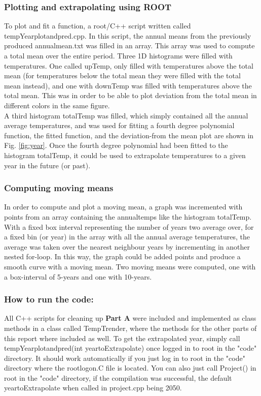 \documentclass[a4paper]{article}
\begin{document}
\subsubsection{Plotting and extrapolating using ROOT}
To plot and fit a function, a root/C++ script written called tempYearplotandpred.cpp. In this script, the annual means from the previously produced annualmean.txt was filled in an array. This array was used to compute a total mean over the entire period. Three 1D histograms were filled with
temperatures. One called upTemp, only filled with temperatures above the total mean (for temperatures below the total mean they were filled with the total mean instead), and one with downTemp was filled with temperatures above the total mean. This was in order to be able to plot deviation from the total mean in different colors in the same figure.\\

A third histogram totalTemp was filled, which simply contained all the annual average temperatures, and was used for fitting a fourth degree polynomial function, the fitted function, and the deviation-from the mean plot are shown in Fig. \ref{fig:year}. Once the fourth degree polynomial had been fitted to the histogram totalTemp, it could be used to extrapolate temperatures to a given year in the future (or past).

\subsubsection{Computing moving means}
In order to compute and plot a moving mean, a graph was incremented with points from an array containing the annualtemps like the histogram totalTemp. With a fixed box interval representing the number of years two average over, for a fixed bin (or year) in the array with all the annual average temperatures, the average was taken over the nearest neighbour years by incrementing in another nested for-loop. In this way, the graph could be added points and produce a smooth curve with a moving mean. Two moving means were computed, one with a box-interval of 5-years and one with 10-years.

\subsubsection{How to run the code:}
All C++ scripts for cleaning up \textbf{Part A} were included and implemented as class methods in a class called TempTrender, where the methods for the other parts of this report where included as well. To get the extrapolated year, simply call tempYearplotandpred(int yeartoExtrapolate) once logged in to root in the "code" directory. It should work automatically if you just log in to root in the "code" directory where the rootlogon.C file is located. You can also just call Project() in root in the "code" directory, if the compilation was successful, the default yeartoExtrapolate when called in project.cpp being 2050. 
\end{document}
